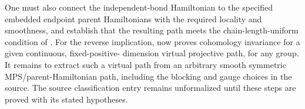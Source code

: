 \documentclass[11pt]{article}
\begin{document}
One must also connect the independent-bond
Hamiltonian to the specified embedded endpoint parent Hamiltonians with
the required locality and smoothness, and establish that the resulting
path meets the chain-length-uniform condition of
.  For the reverse implication,
now proves cohomology invariance for a given continuous, fixed-positive-
dimension virtual projective path, for any group.  It remains to extract
such a virtual path from an arbitrary smooth symmetric MPS/parent-Hamiltonian
path, including the blocking and gauge choices in the source.  The source classification entry
remains unformalized until these steps are proved with its stated
hypotheses.
\end{document}
